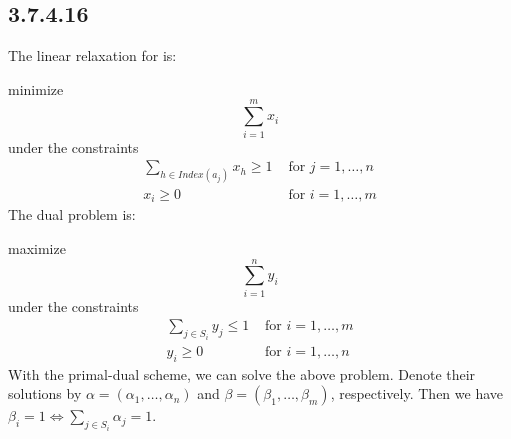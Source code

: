 \documentclass[twocolumn, 10.5pt]{article}
\begin{document}
	\subsection*{3.7.4.16}
	The linear relaxation for  is:\par 
	minimize
	\[
	\sum_{i=1}^{m}x_i
	\]
	under the constraints
	\[
	\begin{aligned}
	\sum_{h\in Index(a_j)}x_h\ge 1&\text{ for $j=1,\dots,n$}\\
	x_i\ge 0&\text{ for $i=1,\dots, m$}	
	\end{aligned}
	\]
	The dual problem is:\par 
	maximize
	\[
	\sum_{i=1}^{n}y_i
	\]
	under the constraints
	\[
	\begin{aligned}
	\sum_{j\in S_i}y_j\le 1&\text{ for $i=1,\dots,m$}\\
	y_i\ge 0&\text{ for $i=1,\dots,n$}
	\end{aligned}
	\]
	With the primal-dual scheme, we can solve the above problem. Denote their solutions by $\alpha=(\alpha_1,\dots,\alpha_n)$ and $\beta=(\beta_1,\dots,\beta_m)$, respectively. Then we have $\beta_i=1\Leftrightarrow \sum_{j\in S_i}\alpha_j=1$.
\end{document}
